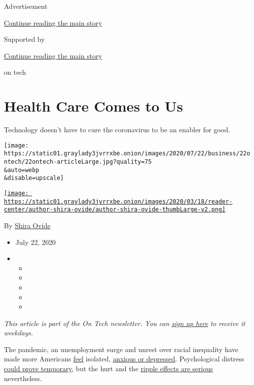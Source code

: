 Advertisement

\protect\hyperlink{after-top}{Continue reading the main story}

Supported by

\protect\hyperlink{after-sponsor}{Continue reading the main story}

on tech

\hypertarget{health-care-comes-to-us}{%
\section{Health Care Comes to Us}\label{health-care-comes-to-us}}

Technology doesn't have to cure the coronavirus to be an enabler for
good.

\texttt{[image: https://static01.graylady3jvrrxbe.onion/images/2020/07/22/business/22ontech/22ontech-articleLarge.jpg?quality=75\\\&auto=webp\\\&disable=upscale]}

\href{https://www.nytimes3xbfgragh.onion/by/shira-ovide}{\texttt{[image: https://static01.graylady3jvrrxbe.onion/images/2020/03/18/reader-center/author-shira-ovide/author-shira-ovide-thumbLarge-v2.png]}}

By \href{https://www.nytimes3xbfgragh.onion/by/shira-ovide}{Shira Ovide}

\begin{itemize}
\item
  July 22, 2020
\item
  \begin{itemize}
  \item
  \item
  \item
  \item
  \item
  \end{itemize}
\end{itemize}

\emph{This article is part of the On Tech newsletter. You can}
\href{https://www.nytimes3xbfgragh.onion/newsletters/signup/OT}{\emph{sign
up here}} \emph{to receive it weekdays.}

The pandemic, an unemployment surge and unrest over racial inequality
have made more Americans
\href{https://www.nytimes3xbfgragh.onion/2020/04/09/opinion/covid-anxiety.html}{feel}
isolated,
\href{https://www.kff.org/statedata/mental-health-and-substance-use-state-fact-sheets/}{anxious
or depressed}. Psychological distress
\href{https://www.nytimes3xbfgragh.onion/2020/06/21/health/coronavirus-mental-health-anxiety.html}{could
prove temporary,} but the hurt and the
\href{https://www.nytimes3xbfgragh.onion/interactive/2020/07/15/upshot/drug-overdose-deaths.html}{ripple
effects are serious} nevertheless.

